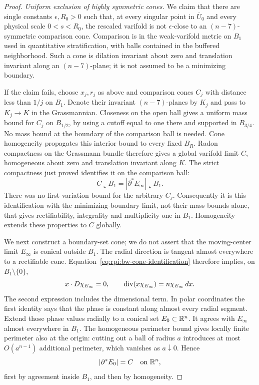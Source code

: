 \begin{proof}
\emph{Uniform exclusion of highly symmetric cones.}
We claim that there are single constants $\epsilon,R_0>0$
such that, at every singular point in $\overline U_0$ and
every physical scale $0<s<R_0$, the rescaled varifold is not
$\epsilon$-close to an $(n-7)$-symmetric comparison cone.
Comparison is in the weak-varifold metric on $B_1$ used in
quantitative stratification, with balls contained in the buffered
neighborhood. Such a cone is dilation invariant about zero and
translation invariant along an $(n-7)$-plane; it is not assumed
to be a minimizing boundary.

If the claim fails, choose $x_j,r_j$ as above and comparison
cones $C_j$ with distance less than $1/j$ on $B_1$. Denote
their invariant $(n-7)$-planes by $K_j$ and pass to
$K_j\to K$ in the Grassmannian. Closeness on the open ball
gives a uniform mass bound for $C_j$ on $B_{1/2}$, by using
a cutoff equal to one there and supported in $B_{3/4}$.
No mass bound at the boundary of the comparison ball is needed.
Cone homogeneity propagates this interior bound to every fixed
$B_R$. Radon compactness on the Grassmann bundle therefore
gives a global varifold limit $C$, homogeneous about zero and
translation invariant along $K$. The strict compactness just
proved identifies it on the comparison ball:
\begin{equation}\label{eq:rpi:bw-cone-identification}
 C\llcorner B_1
    =|\partial^*E_\infty|\llcorner B_1.
\end{equation}
There was no first-variation bound for the arbitrary $C_j$.
Consequently it is this identification with the minimizing-boundary
limit, not their mass bounds alone, that gives rectifiability,
integrality and multiplicity one in $B_1$. Homogeneity extends
these properties to $C$ globally.

We next construct a boundary-set cone; we do not assert that the
moving-center limit $E_\infty$ is conical outside $B_1$.
The radial direction is tangent almost everywhere to a rectifiable
cone. Equation~\eqref{eq:rpi:bw-cone-identification} therefore
implies, on $B_1\setminus\{0\}$,
\[
 x\cdot D\chi_{E_\infty}=0,
 \qquad
 \operatorname{div}(x\chi_{E_\infty})=n\chi_{E_\infty}\,dx.
\]
The second expression includes the dimensional term. In polar
coordinates the first identity says that the phase is constant
along almost every radial segment. Extend those phase values
radially to a conical set $E_0\subset\mathbb R^n$. It agrees with
$E_\infty$ almost everywhere in $B_1$. The homogeneous
perimeter bound gives locally finite perimeter also at the
origin: cutting out a ball of radius $a$ introduces at most
$O(a^{n-1})$ additional perimeter, which vanishes as
$a\downarrow0$. Hence
\[
 |\partial^*E_0|=C
 \quad\hbox{on }\mathbb R^n,
\]
first by agreement inside $B_1$, and then by homogeneity.


\end{proof}
